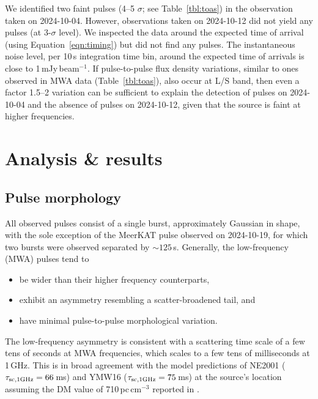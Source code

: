 \documentclass[fleqn,usenatbib]{mnras}
\begin{document}
We identified two faint pulses (4--5 $\sigma$; see Table~\ref{tbl:toas}) in the observation taken on 2024-10-04. However, observations taken on 2024-10-12 did not yield any pulses (at 3-$\sigma$ level). We inspected the data around the expected time of arrival (using Equation~\ref{eqn:timing}) but did not find any pulses. The instantaneous noise level, per 10\,s integration time bin, around the expected time of arrivals is close to 1\,mJy\,beam$^{-1}$. If pulse-to-pulse flux density variations, similar to ones observed in MWA data (Table~\ref{tbl:toas}), also occur at L/S band, then even a factor 1.5--2 variation can be sufficient to explain the detection of pulses on 2024-10-04 and the absence of pulses on 2024-10-12, given that the source is faint at higher frequencies. 

\section{Analysis \& results} \label{sec:analysis}

\subsection{Pulse morphology}

All observed pulses consist of a single burst, approximately Gaussian in shape, with the sole exception of the MeerKAT pulse observed on 2024-10-19, for which two bursts were observed separated by ${\sim}125\,$s.
Generally, the low-frequency (MWA) pulses tend to
\begin{itemize}
    \item be wider than their higher frequency counterparts,
    \item exhibit an asymmetry resembling a scatter-broadened tail, and
    \item have minimal pulse-to-pulse morphological variation.
\end{itemize}

The low-frequency asymmetry is consistent with a scattering time scale of a few tens of seconds at MWA frequencies, which scales to a few tens of milliseconds at 1\,GHz.
This is in broad agreement with the model predictions of NE2001 ($\tau_{\rm sc,1GHz} = 66\,$ms) and YMW16 ($\tau_{\rm sc,1 GHz} = 75\,$ms) at the source's location assuming the DM value of 710\,pc\,cm$^{-3}$ reported in .
\end{document}
